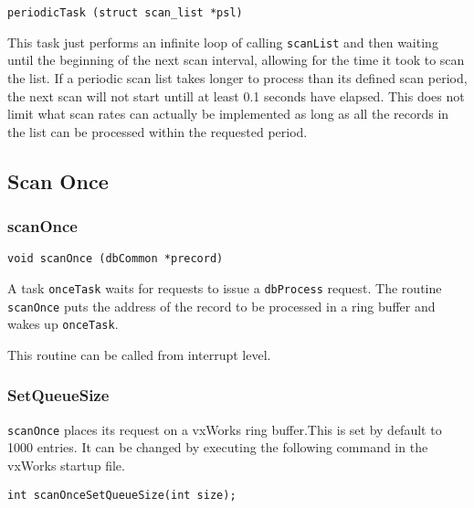 \begin{verbatim}
periodicTask (struct scan_list *psl)
\end{verbatim}

This task just performs an infinite loop of calling \verb|scanList| and then waiting until the beginning of the next scan 
interval, allowing for the time it took to scan the list. If a periodic scan list takes longer to process than its defined scan 
period, the next scan will not start untill at least 0.1 seconds have elapsed.  This does not limit what scan rates can actually 
be implemented as long as all the records in the list can be processed within the requested period.

\subsection{Scan Once}

\subsubsection{scanOnce}

\begin{verbatim}
void scanOnce (dbCommon *precord)
\end{verbatim}

A task \verb|onceTask| waits for requests to issue a \verb|dbProcess| request. The routine \verb|scanOnce| puts the address of the 
record to be processed in a ring buffer and wakes up \verb|onceTask|.

This routine can be called from interrupt level.

\subsubsection{SetQueueSize}

\verb|scanOnce| places its request on a vxWorks ring buffer.This is set by default to 1000 entries. It can be changed by 
executing the following command in the vxWorks startup file.

\begin{verbatim}
int scanOnceSetQueueSize(int size);
\end{verbatim}












